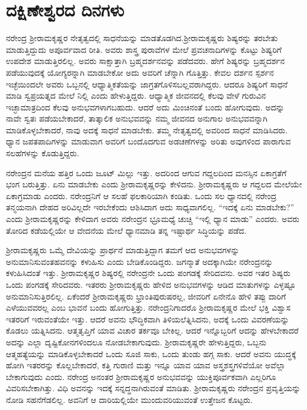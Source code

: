 
\chapter{ದಕ್ಷಿಣೇಶ್ವರದ ದಿನಗಳು}

ನರೇಂದ್ರ ಶ‍್ರೀರಾಮಕೃಷ್ಣರ ನೇತೃತ್ವದಲ್ಲಿ ಸಾಧನೆಯನ್ನು ಮಾಡತೊಡಗಿದ.\break ಶ‍್ರೀರಾಮಕೃಷ್ಣರು ಶಿಷ್ಯರನ್ನು ತರಬೇತು ಮಾಡುತ್ತಿದ್ದುದು ಅಪೂರ್ವವಾದ ರೀತಿ. ಅವರು ಶಾಸ್ತ್ರ ಪುರಾವೆಗಳ ಮೇಲೆ ಪ್ರವಚನಾದಿಗಳನ್ನು ಕೊಟ್ಟು ಶಿಷ್ಯರಿಗೆ ಉಪದೇಶ ಮಾಡುತ್ತಿರಲಿಲ್ಲ. ಅವರು ಸಾಕ್ಷಾತ್ತಾಗಿ ಬ್ರಹ್ಮದರ್ಶನವನ್ನು ಪಡೆದವರು. ಹೇಗೆ ಶಿಷ್ಯರನ್ನು ಬ್ರಹ್ಮದರ್ಶನ ಪಡೆಯುವುದಕ್ಕೆ ಯೋಗ್ಯರನ್ನಾಗಿ ಮಾಡಬೇಕೋ ಅದು ಅವರಿಗೆ ಚೆನ್ನಾಗಿ ಗೊತ್ತಿತ್ತು. ಕೇವಲ ದರ್ಶನ ಸ್ಪರ್ಶನ ಇಚ್ಛೆಯಿಂದಲೇ ಅವರು ಒಬ್ಬನಲ್ಲಿ ಆಧ್ಯಾತ್ಮಿಕತೆಯನ್ನು ಜಾಗ್ರತಗೊಳಿಸಬಲ್ಲವರಾಗಿದ್ದರು. ಆದರೂ ಶಿಷ್ಯರಿಗೆ ಸಾಧನೆ ಮಾಡಿ ಸ್ವಪ್ರಯತ್ನದ ಮೇಲೆ ನಿಲ್ಲಿ ಎಂದು ಹೇಳುತ್ತಿದ್ದರು. ಆಧ್ಯಾತ್ಮಿಕ ಜೀವನದಲ್ಲಿ ಕೆಲವು ವೇಳೆ ಗುರುವಿನ ಇಚ್ಛಾಮಾತ್ರದಿಂದ ಕೆಲವು ಅನುಭವಗಳಾಗಬಹುದು. ಆದರೆ ಅದು ಮಿಂಚಿನಂತೆ ಬಂದು ಹೋಗುವುದು. ಅದನ್ನು ನಾವೇ ಸ್ವತಃ ಪಡೆಯಬೇಕಾದರೆ, ತಾತ್ಕಾಲಿಕ ಅನುಭವವನ್ನು ನಮ್ಮ ಜೀವನದ ಅನುಗಾಲ ಅನುಭವವನ್ನಾಗಿ ಮಾಡಿಕೊಳ್ಳಬೇಕಾದರೆ, ನಾವು ಅದಕ್ಕೆ ಸಾಧನೆ ಮಾಡಬೇಕು. ತಮ್ಮ ನೇತೃತ್ವದಲ್ಲಿ ಅವರಿಂದ ಸಾಧನೆ ಮಾಡಿಸಿದರು. ಧ್ಯಾನ ಜಪತಪಾದಿಗಳನ್ನು ಮಾಡುವಾಗ ಅವರಿಗೆ ಬಂದೊದಗುವ ಅಡಚಣೆಗಳನ್ನು ಅರಿತು ಅವುಗಳಿಂದ ಪಾರಾಗುವ ಸಲಹೆಗಳನ್ನು ಕೊಡುತ್ತಿದ್ದರು.

ನರೇಂದ್ರನ ಮನೆಯ ಹತ್ತಿರ ಒಂದು ಜೂಟ್ ಮಿಲ್ಲು ಇತ್ತು. ಅದರಿಂದ ಆಗುವ ಗದ್ದಲದಿಂದ ಮನಸ್ಸಿನ ಏಕಾಗ್ರತೆಗೆ ಭಂಗ ಬರುತ್ತಿತ್ತು. ಏನು ಮಾಡಬೇಕು ಎಂದು ಶ‍್ರೀರಾಮಕೃಷ್ಣರನ್ನು ಕೇಳಿದನು. ಶ‍್ರೀರಾಮಕೃಷ್ಣರು ಆ ಗದ್ದಲದ ಮೇಲೆಯೇ ಏಕಾಗ್ರಮಾಡು ಎಂದರು. ನರೇಂದ್ರನಿಗೆ ಆ ಸಲಹೆ ಫಲಕಾರಿಯಾಗಿ ಕಂಡಿತು. ಒಂದು ಸಲ ಧ್ಯಾನದಲ್ಲಿ ನರೇಂದ್ರ ತನ್ಮಯನಾಗಿ ದೇಹದ ಅರಿವಿಲ್ಲದೇ ಇರಬೇಕೆಂದು ಆಶಿಸಿದಾಗ ಅದು ಸಾಧ್ಯವಾಗಲಿಲ್ಲ. “ಇದಕ್ಕೆ ಏನು ಮಾಡಬೇಕು?” ಎಂದು ಶ‍್ರೀರಾಮಕೃಷ್ಣರನ್ನು ಕೇಳಿದಾಗ ಅವರು ನರೇಂದ್ರನ ಭ್ರೂಮಧ್ಯೆ ಚುಚ್ಚಿ “ಇಲ್ಲಿ ಧ್ಯಾನ ಮಾಡು” ಎಂದರು. ಅವರು ತೋರಿದ ಕಡೆಯಲ್ಲಿಯೇ ಆ ವೇದನೆಯ ಮೇಲೆ ಧ್ಯಾನಮಾಡಿ ತನ್ನ ಇಷ್ಟಾರ್ಥ ಸಿದ್ಧಿಯನ್ನು ಪಡೆದ.

ಶ‍್ರೀರಾಮಕೃಷ್ಣರು ಒಮ್ಮೆ ದೇವಿಯನ್ನು ಪ್ರಾರ್ಥನೆ ಮಾಡುತ್ತಿದ್ದಾಗ ತಮಗೆ ಆದ ಅನುಭವಗಳನ್ನು ಅನುಮಾನಿಸುವಂತಹವನನ್ನು ಕಳುಹಿಸು ಎಂದು ಬೇಡಿಕೊಂಡಿದ್ದರು. ಜಗನ್ಮಾತೆ ಅದಕ್ಕಾಗಿಯೇ ನರೇಂದ್ರನನ್ನು ಕಳುಹಿಸಿದಂತೆ ಇತ್ತು. ಶ‍್ರೀರಾಮಕೃಷ್ಣರ ಶಿಷ್ಯರಲ್ಲಿ ನರೇಂದ್ರನೇ ಒಂದು ಪಂಗಡಕ್ಕೆ ಸೇರಿದವನು. ಅವರ ಇತರ ಶಿಷ್ಯರು ಒಂದು ಪಂಗಡಕ್ಕೆ ಸೇರಿದವರು. ಇತರರು ಶ‍್ರೀರಾಮಕೃಷ್ಣರು ಹೇಳಿದ ಅನುಭವಗಳನ್ನು ಆಡಿದ ಮಾತುಗಳನ್ನು ಎಳ್ಳಷ್ಟೂ ಅನುಮಾನಿಸುತ್ತಿರಲಿಲ್ಲ. ಏಕೆಂದರೆ ಶ‍್ರೀರಾಮಕೃಷ್ಣರು ಭ್ರಾಂತಿಪುರುಷರಲ್ಲ, ಜೀವರಿಗೆ ಏನೇನೊ ಹೇಳಿ ತಪ್ಪು ದಾರಿಗೆ ಎಳೆಯುವವರಲ್ಲ ಎಂಬ ಭಾವನೆ ಬಂದು ಹೋಗುತ್ತಿತ್ತು. ನರೇಂದ್ರನಿಗಾದರೊ ಶ‍್ರೀರಾಮಕೃಷ್ಣರ ಮೇಲೆ ಭಕ್ತಿ ವಿಶ್ವಾಸ ಇತರರಿಗೆ ಇರುವಂತೆಯೇ ಇತ್ತು. ಆದರೆ ಅವನು ಭೌದ್ಧಿಕವಾಗಿ ತಿಳಿಯಲೆತ್ನಿಸಿದನು, ಅದಕ್ಕೆ ಒಂದು ವಿವರಣೆಯನ್ನು ಕೊಡಲು ಯತ್ನಿಸಿದನು. ಆತ್ಮತೃಪ್ತಿಗೆ ಯಾವ ವಿಚಾರ ತರ್ಕವೂ ಬೇಕಿಲ್ಲ. ಆದರೆ ಇನ್ನೊಬ್ಬರಿಗೆ ಆದನ್ನು ಹೇಳಬೇಕಾದರೆ ಅದನ್ನು ಎಲ್ಲಾ ದೃಷ್ಟಿಕೋನಗಳಿಂದಲೂ ನೋಡಬೇಕಾಗುವುದು. ಶ‍್ರೀರಾಮಕೃಷ್ಣರೇ ಹೇಳುತ್ತಿದ್ದರು, ಒಬ್ಬನು ಆತ್ಮಹತ್ಯೆಯನ್ನು ಮಾಡಿಕೊಳ್ಳಬೇಕಾದರೆ ಒಂದು ಸೂಜಿ ಸಾಕು, ಒಂದು ತುಂಡು ಹಗ್ಗ ಸಾಕು. ಆದರೆ ಅವನು ಯುದ್ಧಕ್ಕೆ ಹೋಗಿ ಇತರರನ್ನು ಕೊಲ್ಲಬೇಕಾದರೆ, ಕತ್ತಿ ಗುರಾಣಿ ಮತ್ತು ಇನ್ನೂ ಯಾವ ಯಾವ ಅಸ್ತ್ರಶಸ್ತ್ರಗಳಿವೆಯೋ ಅವೆಲ್ಲಾ ಬೇಕಾಗುವುದು ಎಂದು. ನರೇಂದ್ರ ಅನಂತರ ಶ‍್ರೀರಾಮಕೃಷ್ಣರ ಅನುಭವವನ್ನು ಯುಕ್ತಿಪೂರ್ವಕವಾಗಿ ಎಲ್ಲರಿಗೂ ವಿವರಿಸಬೇಕಾಗಿತ್ತು. ವಿಧಿ ಅವನನ್ನು ಇದಕ್ಕೆ ಸನ್ನದ್ಧನಾಗಿರುವಂತೆ ಮಾಡಿತು. ಶ‍್ರೀರಾಮಕೃಷ್ಣರು ನರೇಂದ್ರನ ಪ್ರವೃತ್ತಿಯನ್ನು ನೋಡಿ ಸಹನೆಗೆಡಲಿಲ್ಲ. ಅವನಿಗೆ ಆ ದಾರಿಯಲ್ಲಿಯೇ ಮುಂದುವರಿಯುವಂತೆ ಉತ್ತೇಜನ ಕೊಟ್ಟರು.


